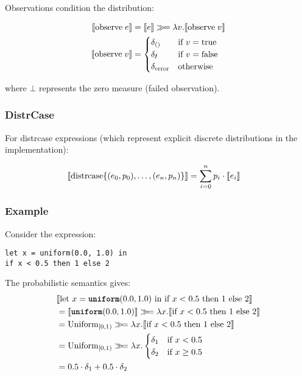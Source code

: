 Observations condition the distribution:

\begin{align*}
\sem{ \text{observe}\; e } &= \sem{ e } \gg\!= \lambda v. \sem{ \text{observe}\; v } \\
%
\sem{ \text{observe}\; v} &=
\begin{cases}
	\delta_{()}  & \text{if $v=\true$} \\
	\delta_{\obsfail} & \text{if $v=\false$} \\
	\delta_\error & \text{otherwise}
\end{cases}
\end{align*}

where $\bot$ represents the zero measure (failed observation).

\subsubsection{DistrCase}

For distrcase expressions (which represent explicit discrete distributions in the implementation):

\begin{align*}
\llbracket  \text{distrcase}\{(e_0, p_0), \ldots, (e_n, p_n)\}  \rrbracket &= \sum_{i=0}^n p_i \cdot \llbracket  e_i  \rrbracket
\end{align*}

\subsubsection{Example}

Consider the expression:
\begin{lstlisting}
let x = uniform(0.0, 1.0) in
if x < 0.5 then 1 else 2
\end{lstlisting}

The probabilistic semantics gives:
\begin{align*}
&\llbracket  \text{let } x = \textnormal{\ttfamily\bfseries uniform}(0.0, 1.0) \text{ in if } x < 0.5 \text{ then } 1 \text{ else } 2  \rrbracket \\
&= \llbracket  \textnormal{\ttfamily\bfseries uniform}(0.0, 1.0)  \rrbracket \gg\!= \lambda x. \llbracket  \text{if } x < 0.5 \text{ then } 1 \text{ else } 2  \rrbracket \\
&= \text{Uniform}_{[0,1)} \gg\!= \lambda x. \llbracket  \text{if } x < 0.5 \text{ then } 1 \text{ else } 2  \rrbracket \\
&= \text{Uniform}_{[0,1)} \gg\!= \lambda x. \begin{cases}
    \delta_1 & \text{if } x < 0.5 \\
    \delta_2 & \text{if } x \geq 0.5
\end{cases} \\
&= 0.5 \cdot \delta_1 + 0.5 \cdot \delta_2
\end{align*}

